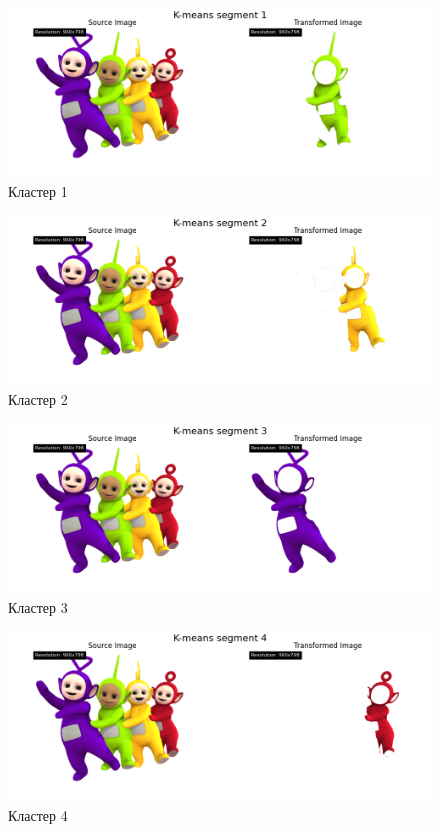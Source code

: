 \begin{figure}[ht!]
    \centering
    \includegraphics[width=\textwidth]{../results/K-means segment 1.png}
    \caption{Кластер 1}
    \label{img:kmeans_cluster_1}
\end{figure}

\begin{figure}[ht!]
    \centering
    \includegraphics[width=\textwidth]{../results/K-means segment 2.png}
    \caption{Кластер 2}
    \label{img:kmeans_cluster_2}
\end{figure}

\begin{figure}[ht!]
    \centering
    \includegraphics[width=\textwidth]{../results/K-means segment 3.png}
    \caption{Кластер 3}
    \label{img:kmeans_cluster_3}
\end{figure}

\begin{figure}[ht!]
    \centering
    \includegraphics[width=\textwidth]{../results/K-means segment 4.png}
    \caption{Кластер 4}
    \label{img:kmeans_cluster_4}
\end{figure}

